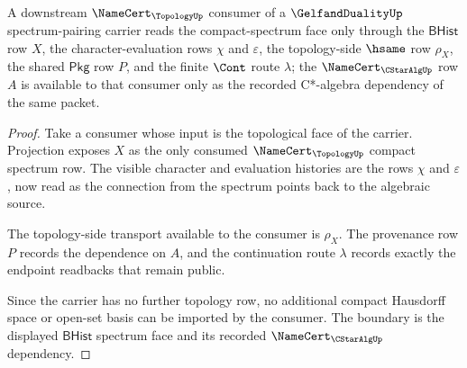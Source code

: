 \begin{theorem}
\label{thm:gelfandduality-topology-consumer-boundary}
A downstream $\NameCert_{\TopologyUp}$ consumer of a $\GelfandDualityUp$
spectrum-pairing carrier reads the compact-spectrum face only through the
$\mathsf{BHist}$ row $X$, the character-evaluation rows $\chi$ and
$\varepsilon$, the topology-side $\hsame$ row $\rho_{X}$, the shared
$\mathsf{Pkg}$ row $P$, and the finite $\Cont$ route $\lambda$; the
$\NameCert_{\CStarAlgUp}$ row $A$ is available to that consumer only as the
recorded C*-algebra dependency of the same packet.
\end{theorem}
\begin{proof}
Take a consumer whose input is the topological face of the carrier.
Projection exposes $X$ as the only consumed $\NameCert_{\TopologyUp}$ compact
spectrum row. The visible character and evaluation histories are the rows
$\chi$ and $\varepsilon$, now read as the connection from the spectrum points
back to the algebraic source.

The topology-side transport available to the consumer is $\rho_{X}$. The
provenance row $P$ records the dependence on $A$, and the continuation route
$\lambda$ records exactly the endpoint readbacks that remain public.

Since the carrier has no further topology row, no additional compact
Hausdorff space or open-set basis can be imported by the consumer. The
boundary is the displayed $\mathsf{BHist}$ spectrum face and its recorded
$\NameCert_{\CStarAlgUp}$ dependency.
\end{proof}

